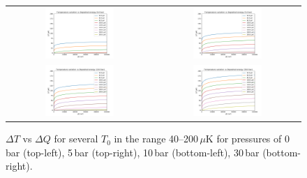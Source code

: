 \documentclass[a4paper,12pt]{article}
\begin{document}
\begin{figure}[!ht]
  \begin{center}
  \begin{tabular}{cc}
    \includegraphics[width=0.49\textwidth]{T_vs_DE-0bar} &
    \includegraphics[width=0.49\textwidth]{T_vs_DE-5bar} \\
    \includegraphics[width=0.49\textwidth]{T_vs_DE-10bar} &
    \includegraphics[width=0.49\textwidth]{T_vs_DE-30bar}
  \end{tabular}
  \end{center}
  \caption{$\Delta T$ vs $\Delta Q$ for several $T_0$ in the range 40--200\,$\mu$K for pressures of 0\,bar (top-left), 5\,bar (top-right), 10\,bar (bottom-left), 30\,bar (bottom-right).}
  \label{fig:TDE}
\end{figure}
\end{document}
